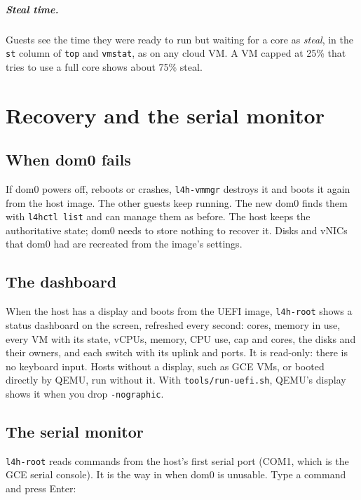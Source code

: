 \documentclass[11pt,a4paper]{report}
\newcommand{\cmd}[1]{\texttt{#1}}
\begin{document}
\paragraph{Steal time.} Guests see the time they were ready to run but
waiting for a core as \emph{steal}, in the \texttt{st} column of
\cmd{top} and \cmd{vmstat}, as on any cloud VM. A VM capped at 25\% that tries
to use a full core shows about 75\% steal.

\chapter{Recovery and the serial monitor}
\label{ch:recovery}

\section{When dom0 fails}

If dom0 powers off, reboots or crashes, \texttt{l4h-vmmgr} destroys it and
boots it again from the host image. The other guests keep running. The new
dom0 finds them with \cmd{l4hctl list} and can manage them as before.
The host keeps the authoritative state; dom0 needs to store
nothing to recover it. Disks and vNICs that dom0 had are recreated from the
image's settings.

\section{The dashboard}

When the host has a display and boots from the UEFI image, \texttt{l4h-root}
shows a status dashboard on the screen, refreshed every second: cores,
memory in use, every VM with its state, vCPUs, memory, CPU use, cap and
cores, the disks and their owners, and each switch with its uplink and
ports. It is read-only: there is no keyboard input. Hosts without a display,
such as GCE VMs, or booted directly by QEMU, run without it. With
\cmd{tools/run-uefi.sh}, QEMU's display shows it when you drop
\texttt{-nographic}.

\section{The serial monitor}

\texttt{l4h-root} reads commands from the host's first serial port (COM1,
which is the GCE serial console). It is the way in when dom0 is unusable.
Type a command and press Enter:
\end{document}
